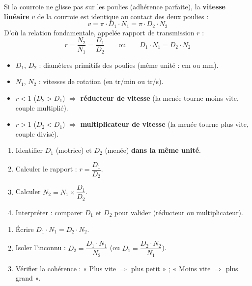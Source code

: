\documentclass[11pt]{article}
\newcommand{\cle}[1]{{\popxbold\color{popdark}#1}}
\begin{document}
\begin{propriete}
Si la courroie ne glisse pas sur les poulies (adhérence parfaite), la \textbf{vitesse linéaire} $v$ de la courroie est identique au contact des deux poulies :
\[ v = \pi \cdot D_1 \cdot N_1 = \pi \cdot D_2 \cdot N_2 \]
D'où la relation fondamentale, appelée \cle{rapport de transmission} $r$ :
\[ r = \frac{N_2}{N_1} = \frac{D_1}{D_2} \qquad \text{ou} \qquad D_1 \cdot N_1 = D_2 \cdot N_2 \]
\begin{itemize}
\item $D_1$, $D_2$ : diamètres primitifs des poulies (même unité : cm ou mm).
\item $N_1$, $N_2$ : vitesses de rotation (en tr/min ou tr/s).
\item $r < 1$ ($D_2 > D_1$) $\Rightarrow$ \textbf{réducteur de vitesse} (la menée tourne moins vite, couple multiplié).
\item $r > 1$ ($D_2 < D_1$) $\Rightarrow$ \textbf{multiplicateur de vitesse} (la menée tourne plus vite, couple divisé).
\end{itemize}
\end{propriete}

\begin{methode}
\begin{enumerate}
\item Identifier $D_1$ (motrice) et $D_2$ (menée) \textbf{dans la même unité}.
\item Calculer le rapport : $r = \dfrac{D_1}{D_2}$.
\item Calculer $N_2 = N_1 \times \dfrac{D_1}{D_2}$.
\item Interpréter : comparer $D_1$ et $D_2$ pour valider (réducteur ou multiplicateur).
\end{enumerate}
\end{methode}

\begin{methode}
\begin{enumerate}
\item Écrire $D_1 \cdot N_1 = D_2 \cdot N_2$.
\item Isoler l'inconnu : $D_2 = \dfrac{D_1 \cdot N_1}{N_2}$ (ou $D_1 = \dfrac{D_2 \cdot N_2}{N_1}$).
\item Vérifier la cohérence : « Plus vite $\Rightarrow$ plus petit » ; « Moins vite $\Rightarrow$ plus grand ».
\end{enumerate}
\end{methode}
\end{document}
